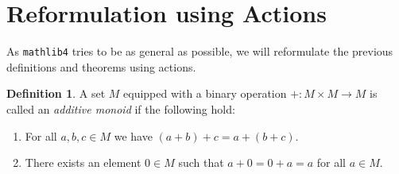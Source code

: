 \documentclass[11pt]{article}
\newtheorem{theorem}{Theorem}[section]
\theoremstyle{definition}              %
\newtheorem{definition}[theorem]{Definition}
\theoremstyle{definition}              %
\theoremstyle{definition}              %
\begin{document}
\begin{comment}
\pagebreak
\section{Existence of a minimal invariant subsets}
An immediate consequence of theorem \ref{thm1} is the following:

\begin{theorem}\label{thm2}
    Let $X$ be a non-empty and compact topological space and $T: X \to X$ a homeomorphism. Then there exists a closed and non-empty $Y \subseteq X$ which is $T-$invariant and such that the action induced by $T|_Y:Y \to Y$ in the sense of equation \ref{eq1} is minimal.
\end{theorem}

We give a proof from Ceglie's lecture notes (see \citep[Thm.~1.14,pp.~13 ff.]{ceglie}).

\begin{proof}
    We begin by defining the family:
    \begin{equation}
        \mathcal{E}:=\{Y \subseteq X | Y \neq \varnothing, Y \text{ is closed and } TY=Y\}. 
    \end{equation}
    Then $X \in \mathcal{E}$ so $\mathcal{E} \neq \varnothing$. Moreover, if $(Y_k)_{k \in I}$ is any chain with respect to $\supseteq$ in $\mathcal{E}$ for some index set $I$, then:
    \begin{equation}
        Y^* := \bigcap_{k \in I} Y_k
    \end{equation}
    yields a lower bound on the chain. As the chain we picked was arbitrary, by \textbf{Zorn's Lemma} (and using the Axiom of Choice) we get that there exists a minimal element $Y$ of $\mathcal{E}$. But then as an immediate consequence of theorem \ref{thm1} $T|_Y:Y \to Y$ is minimal.
\end{proof}
\end{comment}


\pagebreak
\section{Reformulation using Actions}

As \texttt{mathlib4} tries to be as general as possible, we will reformulate the previous definitions and theorems using actions.

\begin{definition}
A set $M$ equipped with a binary operation $+ \colon M \times M \to M$ is called an \emph{additive monoid} if the following hold:
\begin{enumerate}
  \item For all $a,b,c \in M$ we have $(a + b) + c = a + (b + c)$.
  \item There exists an element $0 \in M$ such that $a + 0 = 0 + a = a$ for all $a \in M$.
\end{enumerate}
\end{definition}
\end{document}
